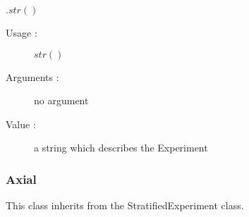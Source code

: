 \begin{description}
\begin{description}
  \item $.str()$
    \begin{description}
    \item[Usage :] $str()$
    \item[Arguments :] no argument
    \item[Value :] a string which describes the Experiment
    \end{description}

  \end{description}

\end{description}


\newpage         \subsubsection{Axial}

This class inherits from the StratifiedExperiment class.\\

